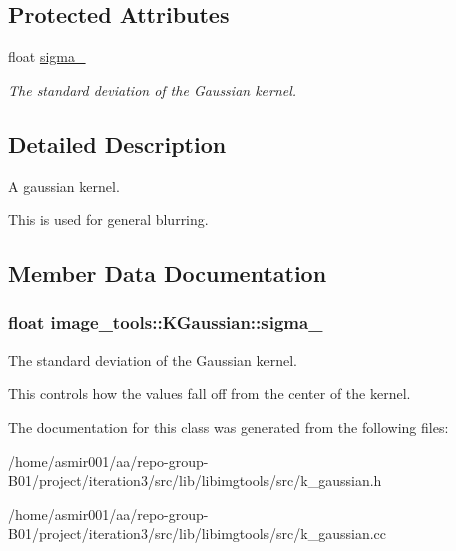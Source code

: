 \subsection*{Protected Attributes}
\begin{DoxyCompactItemize}
\item 
float \hyperlink{classimage__tools_1_1KGaussian_aae4a308fd2f1065b363660681c863eed}{sigma\+\_\+}
\begin{DoxyCompactList}\small\item\em The standard deviation of the Gaussian kernel. \end{DoxyCompactList}\end{DoxyCompactItemize}


\subsection{Detailed Description}
A gaussian kernel. 

This is used for general blurring. 

\subsection{Member Data Documentation}
\subsubsection[{\texorpdfstring{sigma\+\_\+}{sigma_}}]{\setlength{\rightskip}{0pt plus 5cm}float image\+\_\+tools\+::\+K\+Gaussian\+::sigma\+\_\+\hspace{0.3cm}{\ttfamily [protected]}}\hypertarget{classimage__tools_1_1KGaussian_aae4a308fd2f1065b363660681c863eed}{}\label{classimage__tools_1_1KGaussian_aae4a308fd2f1065b363660681c863eed}


The standard deviation of the Gaussian kernel. 

This controls how the values fall off from the center of the kernel. 

The documentation for this class was generated from the following files\+:\begin{DoxyCompactItemize}
\item 
/home/asmir001/aa/repo-\/group-\/\+B01/project/iteration3/src/lib/libimgtools/src/k\+\_\+gaussian.\+h\item 
/home/asmir001/aa/repo-\/group-\/\+B01/project/iteration3/src/lib/libimgtools/src/k\+\_\+gaussian.\+cc\end{DoxyCompactItemize}

